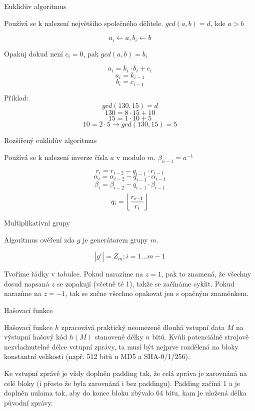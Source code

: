 \sec Euklidův algoritmus

Používá se k nalezení největšího společného dělitele. $gcd(a,b) = d$, kde $a > b$

$$a_i \leftarrow a, b_i \leftarrow b$$
\centerline{Opakuj dokud není $c_i = 0$, pak $gcd(a,b) = b_i$}
$$a_i = k_i \cdot b_i + c_i$$
$$a_i = k_{i-1}$$
$$b_i = c_{i-1}$$

\noindent
Příklad:
$$gcd(130,15) = d$$
$$130 = 8 \cdot 15 + 10$$
$$15 = 1 \cdot 10 + 5$$
$$10 = 2 \cdot 5 \rightarrow gcd(130,15) = 5$$

\sec Rozšířený euklidův algoritmus

Používá se k nalezení inverze čísla $a$ v modulo $m$. $\beta_{n-1} = a^{-1}$



$$r_i = r_{i-2} - q_{i-1} \cdot r_{i-1}$$
$$\alpha_i = \alpha_{i-2} - q_{i-1} \cdot \alpha_{i-1}$$
$$\beta_i = \beta_{i-2} - q_{i-1} \cdot \beta_{i-1}$$
$$q_i = \left\lfloor r_{i-1} \over r_i \right\rfloor$$

\endmulti

\sec Multiplikativní grupy

Algoritmus ověření zda $g$ je generátorem grupy $m$.

$$\left|g^i\right| = Z_m; i = 1 \ldots m - 1$$

\noindent
Tvoříme řádky v tabulce. Pokud narazíme na $z = 1$, pak to znamená, že všechny dosud napsaná $z$ se zopakují (včetně té 1), takže se začínáme cyklit. Pokud narazíme na $z = -1$, tak se začne všechno opakovat jen s opačným znaménkem.


\chap Hašovací funkce

Hašovací funkce $h$ zpracovává praktický neomezeně dlouhá vstupní data $M$ na výstupní hašový kód $h(M)$ stanovené délky $n$ bitů.
Kvůli potenciálně strojově nezvladnutelné délce vstupní zprávy, ta musí být nejprve rozdělená na bloky konstantní velikosti (např. 512 bitů u MD5 a SHA-0/1/256).

Ke vstupní zprávě je vždy doplněn padding tak, že celá zpráva je zarovnáná na celé bloky (i přesto že byla zarovnáná i bez paddingu). Padding začíná 1 a je doplněn nulama tak, aby do konce bloku zbývalo 64 bitu, kam je uložená délka původní zprávy.

